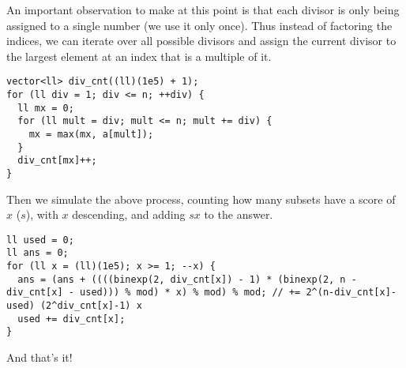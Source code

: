 \documentclass{article}
\begin{document}
An important observation to make at this point is that each divisor is only being assigned to a single number (we use it only once). Thus instead of factoring the indices, we can iterate over all possible divisors and assign the current divisor to the largest element at an index that is a multiple of it.
\begin{verbatim}
vector<ll> div_cnt((ll)(1e5) + 1);
for (ll div = 1; div <= n; ++div) {
  ll mx = 0;
  for (ll mult = div; mult <= n; mult += div) {
    mx = max(mx, a[mult]);
  }
  div_cnt[mx]++;
}
\end{verbatim}

Then we simulate the above process, counting how many subsets have a score of $x$ ($s$), with $x$ descending, and adding $sx$ to the answer.
\begin{verbatim}
ll used = 0;
ll ans = 0;
for (ll x = (ll)(1e5); x >= 1; --x) {
  ans = (ans + ((((binexp(2, div_cnt[x]) - 1) * (binexp(2, n - div_cnt[x] - used))) % mod) * x) % mod) % mod; // += 2^(n-div_cnt[x]-used) (2^div_cnt[x]-1) x
  used += div_cnt[x];
}
\end{verbatim}

And that's it!
\end{document}
